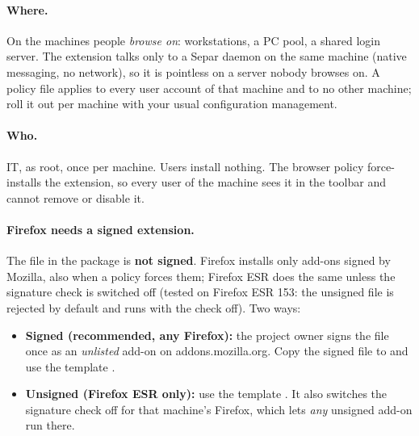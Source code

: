 \documentclass[11pt,a4paper]{article}
\begin{document}
\paragraph{Where.} On the machines people \emph{browse on}: workstations, a PC pool, a shared login
server. The extension talks only to a Separ daemon on the same machine (native messaging, no
network), so it is pointless on a server nobody browses on. A policy file applies to every user
account of that machine and to no other machine; roll it out per machine with your usual
configuration management.

\paragraph{Who.} IT, as root, once per machine. Users install nothing. The browser policy
force-installs the extension, so every user of the machine sees it in the toolbar and cannot remove
or disable it.

\paragraph{Firefox needs a signed extension.} The file 
in the package is \textbf{not signed}. Firefox installs only add-ons signed by Mozilla, also when a
policy forces them; Firefox ESR does the same unless the signature check is switched off (tested on
Firefox ESR 153: the unsigned file is rejected by default and runs with the check off). Two ways:
\begin{itemize}
  \item \textbf{Signed (recommended, any Firefox):} the project owner signs the file once as an
    \emph{unlisted} add-on on addons.mozilla.org. Copy the signed file to
     and use the template
    .
  \item \textbf{Unsigned (Firefox ESR only):} use the template
    . It also switches the signature check off for that
    machine's Firefox, which lets \emph{any} unsigned add-on run there.
\end{itemize}
\end{document}
